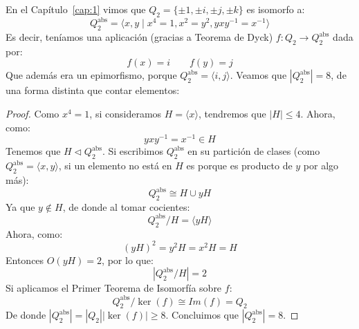 \begin{ejemplo}
    En el Capítulo~\ref{cap:1} vimos que $Q_2 = \{\pm 1, \pm i, \pm j, \pm k\}$ es isomorfo a:
    \begin{equation*}
        Q_2^{\text{abs}} = \langle x,y\mid x^4=1, x^2=y^2, yxy^{-1} = x^{-1} \rangle 
    \end{equation*}
    Es decir, teníamos una aplicación (gracias a Teorema de Dyck) $f:Q_2\to Q_2^{\text{abs}}$ dada por:
    \begin{equation*}
        f(x) = i \qquad f(y) = j
    \end{equation*}
    Que además era un epimorfismo, porque $Q_2^{\text{abs}} = \langle i,j \rangle $. Veamos que $|Q_2^{\text{abs}}| = 8$, de una forma distinta que contar elementos:
    \begin{proof} %
        Como $x^4 = 1$, si consideramos $H = \langle x \rangle $, tendremos que $|H| \leq 4$. Ahora, como:
        \begin{equation*}
            yxy^{-1} = x^{-1}\in H 
        \end{equation*}
        Tenemos que $H\lhd Q_2^{\text{abs}}$. Si escribimos $Q_2^{\text{abs}}$ en su partición de clases (como $Q_2^{\text{abs}} = \langle x,y \rangle $, si un elemento no está en $H$ es porque es producto de $y$ por algo más):
        \begin{equation*}
            Q_2^{\text{abs}} \cong H\cup yH
        \end{equation*}
        Ya que $y\notin H$, de donde al tomar cocientes:
        \begin{equation*}
            Q_2^{\text{abs}}/H = \langle yH \rangle 
        \end{equation*}
        Ahora, como:
        \begin{equation*}
            {(yH)}^{2} = y^2H = x^2H = H
        \end{equation*}
        Entonces $O(yH) = 2$, por lo que:
        \begin{equation*}
            |Q_2^{\text{abs}}/H| = 2
        \end{equation*}
        Si aplicamos el Primer Teorema de Isomorfía sobre $f$:
        \begin{equation*}
            Q_2^{\text{abs}}/\ker(f) \cong Im(f) = Q_2
        \end{equation*}
        De donde $|Q_2^{\text{abs}}| = |Q_2||\ker(f)| \geq 8$. Concluimos que $|Q_2^{\text{abs}}| = 8$.
    \end{proof}
\end{ejemplo}

